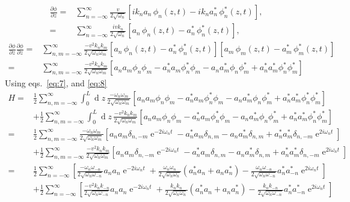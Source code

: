 \begin{align}
  \frac{\partial\phi}{\partial z}=&\sum_{n=-\infty}^\infty \frac{v}{2\sqrt{\omega_n}}
  \left[ik_n a_n\,\phi_n(z,t)-ik_n a_n^*\,\phi_n^*(z,t)\right],\nonumber\\
=&\sum_{n=-\infty}^\infty\frac{i vk_n}{2\sqrt{\omega_n}}
  \left[a_n\,\phi_n(z,t)- a_n^*\,\phi_n^*(z,t)\right],
\end{align}
\begin{align}
   \frac{\partial\phi}{\partial z} \frac{\partial\phi}{\partial z}=&
\sum_{n,m=-\infty}^\infty\frac{-v^2 k_nk_m}{2\sqrt{\omega_n\omega_m}}
  \left[a_n\,\phi_n(z,t)- a_n^*\,\phi_n^*(z,t)\right]
\left[a_m\,\phi_m(z,t)- a_m^*\,\phi_m^*(z,t)\right]\\
=  &
\sum_{n,m=-\infty}^\infty\frac{- v^2k_nk_m}{2\sqrt{\omega_n\omega_m}}
  \left[a_n a_m \phi_n \phi_m- a_n^*a_m\phi_n^*\phi_m-a_n a_m^* \phi_n \phi_m^*+ a_n^*a_m^*\phi_n^*\phi_m^*\right]
\end{align}
Using eqs.~\eqref{eq:7}, and \eqref{eq:8}
\begin{align}
  H=  &\frac12
\sum_{n,m=-\infty}^\infty\int_0^L\operatorname{d}z\,\frac{- \omega_n\omega_m}{2\sqrt{\omega_n\omega_m}} 
  \left[a_n a_m \phi_n \phi_m- a_n^*a_m\phi_n^*\phi_m-a_n a_m^* \phi_n \phi_m^*+ a_n^*a_m^*\phi_n^*\phi_m^*\right]\nonumber\\
&+\frac12\sum_{n,m=-\infty}^\infty\int_0^L\operatorname{d}z\, \frac{- v^2k_nk_m}{2\sqrt{\omega_n\omega_m}}
  \left[a_n a_m \phi_n \phi_m- a_n^*a_m\phi_n^*\phi_m-a_n a_m^* \phi_n \phi_m^*+ a_n^*a_m^*\phi_n^*\phi_m^*\right]\nonumber\\
  =  &\frac12
\sum_{n,m=-\infty}^\infty\frac{- \omega_n\omega_m}{2\sqrt{\omega_n\omega_m}} 
  \left[a_n a_m \delta_{n,-m}\operatorname{e}^{-2i\omega_n t}- a_n^*a_m\delta_{n, m}-a_n a_m^* \delta_{n,m}+ a_n^*a_m^*\delta_{n,-m}\operatorname{e}^{2i\omega_n t}\right] \nonumber\\
  &+\frac12
\sum_{n,m=-\infty}^\infty\frac{-v^2 k_nk_m}{2\sqrt{\omega_n\omega_m}} 
  \left[a_n a_m \delta_{n,-m}\operatorname{e}^{-2i\omega_n t}- a_n^*a_m\delta_{n, m}-a_n a_m^* \delta_{n,m}+ a_n^*a_m^*\delta_{n,-m}\operatorname{e}^{2i\omega_n t}\right]\nonumber\\
  =  &\frac12
\sum_{n=-\infty}^\infty 
  \left[\frac{- \omega_n\omega_{-n}}{2\sqrt{\omega_n\omega_{-n}}}a_n a_n \operatorname{e}^{-2i\omega_n t}
+\frac{ \omega_n\omega_n}{2\sqrt{\omega_n\omega_n}}(a_n^*a_n+a_n a_n^*)- \frac{\omega_n\omega_{-n}}{2\sqrt{\omega_n\omega_{-n}}} a_n^*a_{-n}^*\operatorname{e}^{2i\omega_n t}\right]\nonumber\\
&+\frac12
\sum_{n=-\infty}^\infty 
  \left[\frac{-v^2 k_nk_{-n}}{2\sqrt{\omega_n\omega_{-n}}}a_n a_n \operatorname{e}^{-2i\omega_n t}
+\frac{ k_nk_n}{2\sqrt{\omega_n\omega_n}}(a_n^*a_n+a_n a_n^*)- \frac{k_nk_{-n}}{2\sqrt{\omega_n\omega_{-n}}} a_n^*a_{-n}^*\operatorname{e}^{2i\omega_n t}\right]
\end{align}



